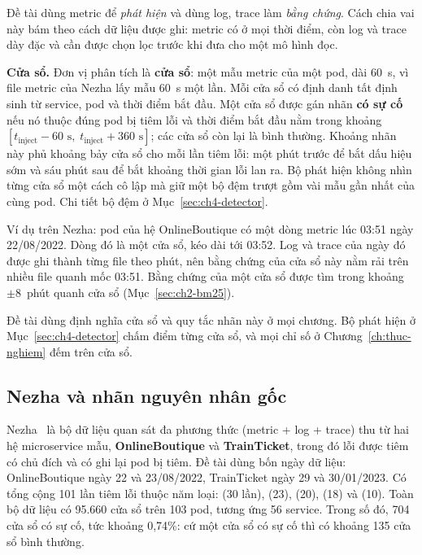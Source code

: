 Đề tài dùng metric để \emph{phát hiện} và dùng log, trace làm \emph{bằng chứng}. Cách chia vai này bám theo cách dữ liệu được ghi: metric có ở mọi thời điểm, còn log và trace dày đặc và cần được chọn lọc trước khi đưa cho một mô hình đọc.

\textbf{Cửa sổ.} Đơn vị phân tích là \textbf{cửa sổ}: một mẫu metric của một pod, dài 60~s, vì file metric của Nezha lấy mẫu 60~s một lần. Mỗi cửa sổ có định danh tất định sinh từ service, pod và thời điểm bắt đầu. Một cửa sổ được gán nhãn \textbf{có sự cố} nếu nó thuộc đúng pod bị tiêm lỗi và thời điểm bắt đầu nằm trong khoảng $[t_{\mathrm{inject}} - 60\text{ s},\; t_{\mathrm{inject}} + 360\text{ s}]$; các cửa sổ còn lại là bình thường. Khoảng nhãn này phủ khoảng bảy cửa sổ cho mỗi lần tiêm lỗi: một phút trước để bắt dấu hiệu sớm và sáu phút sau để bắt khoảng thời gian lỗi lan ra. Bộ phát hiện không nhìn từng cửa sổ một cách cô lập mà giữ một bộ đệm trượt gồm vài mẫu gần nhất của cùng pod. Chi tiết bộ đệm ở Mục~\ref{sec:ch4-detector}.

Ví dụ trên Nezha: pod  của hệ OnlineBoutique có một dòng metric lúc 03:51 ngày 22/08/2022. Dòng đó là một cửa sổ, kéo dài tới 03:52. Log và trace của ngày đó được ghi thành từng file theo phút, nên bằng chứng của cửa sổ này nằm rải trên nhiều file quanh mốc 03:51. Bằng chứng của một cửa sổ được tìm trong khoảng $\pm 8$~phút quanh cửa sổ (Mục~\ref{sec:ch2-bm25}).

Đề tài dùng định nghĩa cửa sổ và quy tắc nhãn này ở mọi chương. Bộ phát hiện ở Mục~\ref{sec:ch4-detector} chấm điểm từng cửa sổ, và mọi chỉ số ở Chương~\ref{ch:thuc-nghiem} đếm trên cửa sổ.

\subsection{Nezha và nhãn nguyên nhân gốc}
\label{sec:ch2-nezha}

Nezha~\cite{yu2023nezha} là bộ dữ liệu quan sát đa phương thức (metric + log + trace) thu từ hai hệ microservice mẫu, \textbf{OnlineBoutique} và \textbf{TrainTicket}, trong đó lỗi được tiêm có chủ đích và có ghi lại pod bị tiêm. Đề tài dùng bốn ngày dữ liệu: OnlineBoutique ngày 22 và 23/08/2022, TrainTicket ngày 29 và 30/01/2023. Có tổng cộng 101 lần tiêm lỗi thuộc năm loại:  (30 lần),  (23),  (20),  (18) và  (10). Toàn bộ dữ liệu có 95.660 cửa sổ trên 103 pod, tương ứng 56 service. Trong số đó, 704 cửa sổ có sự cố, tức khoảng 0,74\%: cứ một cửa sổ có sự cố thì có khoảng 135 cửa sổ bình thường.

